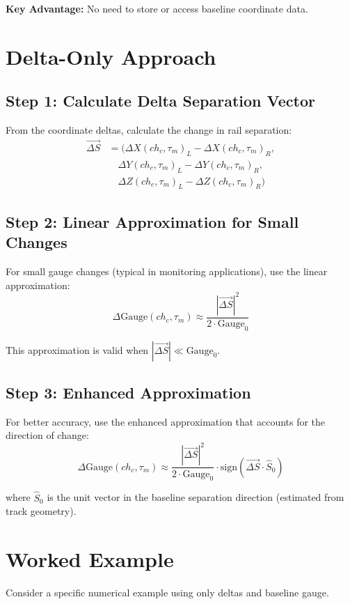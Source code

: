 \documentclass{article}
\begin{document}
\textbf{Key Advantage:} No need to store or access baseline coordinate data.

\section{Delta-Only Approach}

\subsection{Step 1: Calculate Delta Separation Vector}
From the coordinate deltas, calculate the change in rail separation:
\begin{align}
\vec{\Delta S} &= (\Delta X(ch_c, \tau_m)_L - \Delta X(ch_c, \tau_m)_R, \nonumber \\
&\quad \Delta Y(ch_c, \tau_m)_L - \Delta Y(ch_c, \tau_m)_R, \nonumber \\
&\quad \Delta Z(ch_c, \tau_m)_L - \Delta Z(ch_c, \tau_m)_R)
\end{align}

\subsection{Step 2: Linear Approximation for Small Changes}
For small gauge changes (typical in monitoring applications), use the linear approximation:
\begin{equation}
\Delta\text{Gauge}(ch_c, \tau_m) \approx \frac{|\vec{\Delta S}|^2}{2 \cdot \text{Gauge}_0}
\end{equation}

This approximation is valid when $|\vec{\Delta S}| \ll \text{Gauge}_0$.

\subsection{Step 3: Enhanced Approximation}
For better accuracy, use the enhanced approximation that accounts for the direction of change:
\begin{equation}
\Delta\text{Gauge}(ch_c, \tau_m) \approx \frac{|\vec{\Delta S}|^2}{2 \cdot \text{Gauge}_0} \cdot \text{sign}(\vec{\Delta S} \cdot \hat{S}_0)
\end{equation}

where $\hat{S}_0$ is the unit vector in the baseline separation direction (estimated from track geometry).

\section{Worked Example}
Consider a specific numerical example using only deltas and baseline gauge.
\end{document}
